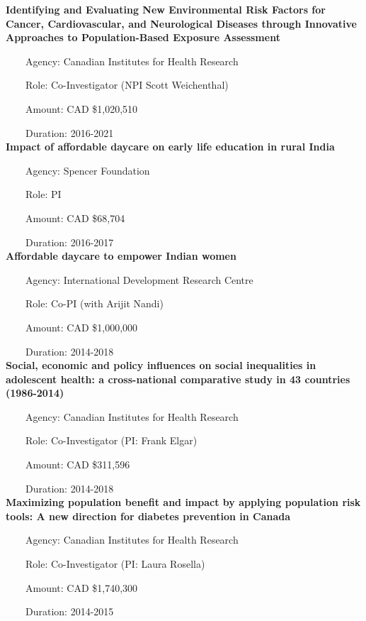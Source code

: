 \documentclass[
  letterpaper,
  DIV=11,
  numbers=noendperiod]{scrartcl}
\begin{document}
\textbf{Identifying and Evaluating New Environmental Risk Factors for
Cancer, Cardiovascular, and Neurological Diseases through Innovative
Approaches to Population-Based Exposure Assessment}\\
\strut ~~~~Agency: Canadian Institutes for Health Research\\
\strut ~~~~Role: Co-Investigator (NPI Scott Weichenthal)\\
\strut ~~~~Amount: CAD \$1,020,510\\
\strut ~~~~Duration: 2016-2021\\

\textbf{Impact of affordable daycare on early life education in rural
India}\\
\strut ~~~~Agency: Spencer Foundation\\
\strut ~~~~Role: PI\\
\strut ~~~~Amount: CAD \$68,704\\
\strut ~~~~Duration: 2016-2017\\

\textbf{Affordable daycare to empower Indian women}\\
\strut ~~~~Agency: International Development Research Centre\\
\strut ~~~~Role: Co-PI (with Arijit Nandi)\\
\strut ~~~~Amount: CAD \$1,000,000\\
\strut ~~~~Duration: 2014-2018\\

\textbf{Social, economic and policy influences on social inequalities in
adolescent health: a cross-national comparative study in 43 countries
(1986-2014)}\\
\strut ~~~~Agency: Canadian Institutes for Health Research\\
\strut ~~~~Role: Co-Investigator (PI: Frank Elgar)\\
\strut ~~~~Amount: CAD \$311,596\\
\strut ~~~~Duration: 2014-2018\\

\textbf{Maximizing population benefit and impact by applying population
risk tools: A new direction for diabetes prevention in Canada}\\
\strut ~~~~Agency: Canadian Institutes for Health Research\\
\strut ~~~~Role: Co-Investigator (PI: Laura Rosella)\\
\strut ~~~~Amount: CAD \$1,740,300\\
\strut ~~~~Duration: 2014-2015\\
\end{document}
